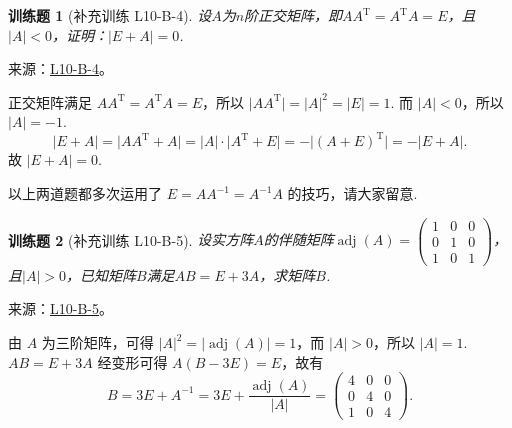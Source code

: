 \documentclass[UTF8,12pt,a4paper,fontset=fandol]{ctexart}
\newtheorem{exercise}{训练题}[section]
\begin{document}
\begin{exercise}[补充训练 L10-B-4]\label{prob:L10-B-4}
设$A$为$n$阶正交矩阵，即$AA^\mathrm{T}=A^\mathrm{T}A=E$，且$|A|<0$，证明：$|E+A|=0$.
\end{exercise}
\noindent 来源：\href{https://github.com/yhwu-is/Linear-Algebra-Left-Undone/blob/new/%E8%AE%B2%E4%B9%89/%E4%B8%93%E9%A2%98/10%20%E8%A1%8C%E5%88%97%E5%BC%8F.tex}{L10-B-4}。
\begin{solve}
正交矩阵满足 $AA^{\mathrm{T}} = A^{\mathrm{T}}A = E$，所以 $\lvert AA^{\mathrm{T}} \rvert = \lvert A \rvert^2 = \lvert E \rvert = 1$. 而 $\lvert A \rvert < 0$，所以 $\lvert A \rvert = -1$.
            \[\lvert E+A \rvert = \lvert AA^{\mathrm{T}}+A \rvert = \lvert A \rvert \cdot \lvert A^{\mathrm{T}}+E \rvert = -\lvert (A+E)^{\mathrm{T}} \rvert = -\lvert E+A \rvert.\]
            故 $\lvert E+A \rvert = 0$.

            以上两道题都多次运用了 $E = AA^{-1} = A^{-1}A$ 的技巧，请大家留意.
\end{solve}

\begin{exercise}[补充训练 L10-B-5]\label{prob:L10-B-5}
设实方阵$A$的伴随矩阵$\operatorname{adj}(A)=\begin{pmatrix}
                1 & 0 & 0 \\ 0 & 1 & 0 \\ 1 & 0 & 1
            \end{pmatrix}$，且$|A|>0$，已知矩阵$B$满足$AB=E+3A$，求矩阵$B$.
\end{exercise}
\noindent 来源：\href{https://github.com/yhwu-is/Linear-Algebra-Left-Undone/blob/new/%E8%AE%B2%E4%B9%89/%E4%B8%93%E9%A2%98/10%20%E8%A1%8C%E5%88%97%E5%BC%8F.tex}{L10-B-5}。
\begin{solve}
由 $A$ 为三阶矩阵，可得 $|A|^2 = |\operatorname{adj}(A)| = 1$，而 $|A|>0$，所以 $|A|=1$. $AB=E+3A$ 经变形可得 $A(B-3E) = E$，故有
            \[
                B = 3E + A^{-1} = 3E + \frac{\operatorname{adj}(A)}{|A|} = \begin{pmatrix}
                    4 & 0 & 0 \\ 0 & 4 & 0 \\ 1 & 0 & 4
                \end{pmatrix}.
            \]
\end{solve}
\end{document}
